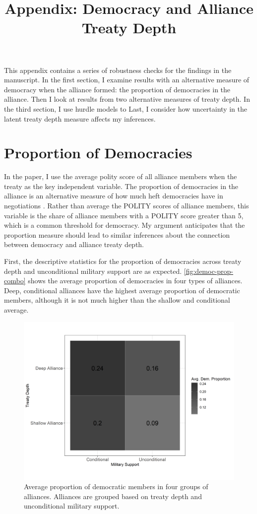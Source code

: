 \documentclass[12pt]{article}
\title{\textbf{Appendix: Democracy and Alliance Treaty Depth}}
\author{}
\date{}
\begin{document}
\maketitle 

\doublespace 

This appendix contains a series of robustness checks for the findings in the manuscript. 
In the first section, I examine results with an alternative measure of democracy when the alliance formed: the proportion of democracies in the alliance. 
Then I look at results from two alternative measures of treaty depth.
In the third section, I use hurdle models to   
Last, I consider how uncertainty in the latent treaty depth measure affects my inferences. 


\section{Proportion of Democracies}


In the paper, I use the average polity score of all alliance members when the treaty as the key independent variable. 
The proportion of democracies in the alliance is an alternative measure of how much heft democracies have in negotiations \cite{Chibaetal2015}.  
Rather than average the POLITY scores of alliance members, this variable is the share of alliance members with a POLITY score greater than 5, which is a common threshold for democracy. 
My argument anticipates that the proportion measure should lead to similar inferences about the connection between democracy and alliance treaty depth.


First, the descriptive statistics for the proportion of democracies across treaty depth and unconditional military support are as expected. 
\autoref{fig:democ-prop-combo} shows the average proportion of democracies in four types of alliances. 
Deep, conditional alliances have the highest average proportion of democratic members, although it is not much higher than the shallow and conditional average.  


\begin{figure}
\includegraphics[width=.95\textwidth]{democ-prop-combo.png}  
\caption{Average proportion of democratic members in four groups of alliances. Alliances are grouped based on treaty depth and unconditional military support.}
\label{fig:democ-prop-combo}
\end{figure}
\end{document}

